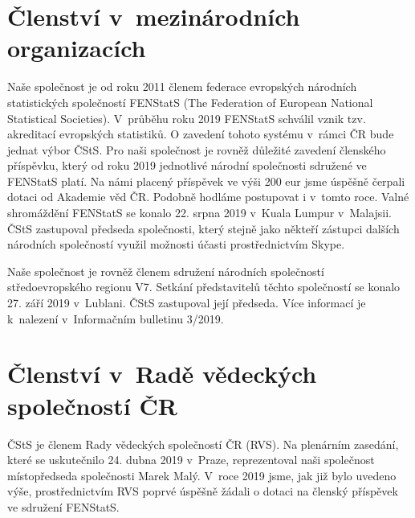 \section*{Členství v mezinárodních organizacích}
Naše společnost je od roku 2011 členem federace evropských národních statistických společností FENStatS (The Federation of European National Statistical Societies). V průběhu roku 2019 FENStatS schválil vznik tzv. akreditací evropských statistiků. O zavedení tohoto systému v rámci ČR bude jednat výbor ČStS. Pro naši společnost je rovněž důležité zavedení členského příspěvku, který od roku 2019 jednotlivé národní společnosti sdružené ve FENStatS platí. Na námi placený příspěvek ve výši 200 eur jsme úspěšně čerpali dotaci od Akademie věd ČR. Podobně hodláme postupovat i v tomto roce. Valné shromáždění FENStatS se konalo 22. srpna 2019 v Kuala Lumpur v Malajsii. ČStS zastupoval předseda společnosti, který stejně jako někteří zástupci dalších národních společností využil možnosti účasti prostřednictvím Skype.

Naše společnost je rovněž členem sdružení národních společností středoevropského regionu V7. Setkání představitelů těchto společností se konalo 27. září 2019 v Lublani. ČStS zastupoval její předseda. Více informací je k nalezení v Informačním bulletinu 3/2019.

\section*{Členství v Radě vědeckých společností ČR}
ČStS je členem Rady vědeckých společností ČR (RVS). Na plenárním zasedání, které se uskutečnilo 24. dubna 2019 v Praze, reprezentoval naši společnost místopředseda společnosti Marek Malý. V roce 2019 jsme, jak již bylo uvedeno výše, prostřednictvím RVS poprvé úspěšně žádali o dotaci na členský příspěvek ve sdružení FENStatS.  

